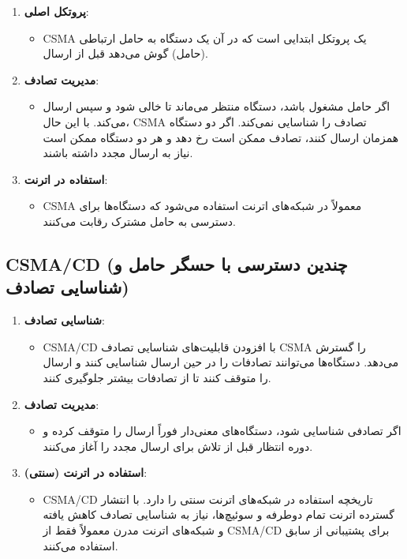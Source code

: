 \begin{enumerate}
    \item \textbf{پروتکل اصلی}:
    \begin{itemize}
        \item CSMA یک پروتکل ابتدایی است که در آن یک دستگاه به حامل ارتباطی (حامل) گوش می‌دهد قبل از ارسال.
    \end{itemize}
    
    \item \textbf{مدیریت تصادف}:
    \begin{itemize}
        \item اگر حامل مشغول باشد، دستگاه منتظر می‌ماند تا خالی شود و سپس ارسال می‌کند. با این حال، CSMA تصادف را شناسایی نمی‌کند. اگر دو دستگاه همزمان ارسال کنند، تصادف ممکن است رخ دهد و هر دو دستگاه ممکن است نیاز به ارسال مجدد داشته باشند.
    \end{itemize}
    
    \item \textbf{استفاده در اترنت}:
    \begin{itemize}
        \item CSMA معمولاً در شبکه‌های اترنت استفاده می‌شود که دستگاه‌ها برای دسترسی به حامل مشترک رقابت می‌کنند.
    \end{itemize}
\end{enumerate}

\subsection*{CSMA/CD (چندین دسترسی با حسگر حامل و شناسایی تصادف)}

\begin{enumerate}
    \item \textbf{شناسایی تصادف}:
    \begin{itemize}
        \item CSMA/CD با افزودن قابلیت‌های شناسایی تصادف CSMA را گسترش می‌دهد. دستگاه‌ها می‌توانند تصادفات را در حین ارسال شناسایی کنند و ارسال را متوقف کنند تا از تصادفات بیشتر جلوگیری کنند.
    \end{itemize}
    
    \item \textbf{مدیریت تصادف}:
    \begin{itemize}
        \item اگر تصادفی شناسایی شود، دستگاه‌های معنی‌دار فوراً ارسال را متوقف کرده و دوره انتظار قبل از تلاش برای ارسال مجدد را آغاز می‌کنند.
    \end{itemize}
    
    \item \textbf{استفاده در اترنت (سنتی)}:
    \begin{itemize}
        \item CSMA/CD تاریخچه استفاده در شبکه‌های اترنت سنتی را دارد. با انتشار گسترده اترنت تمام دوطرفه و سوئیچ‌ها، نیاز به شناسایی تصادف کاهش یافته و شبکه‌های اترنت مدرن معمولاً فقط از CSMA/CD برای پشتیبانی از سابق استفاده می‌کنند.
    \end{itemize}
\end{enumerate}


